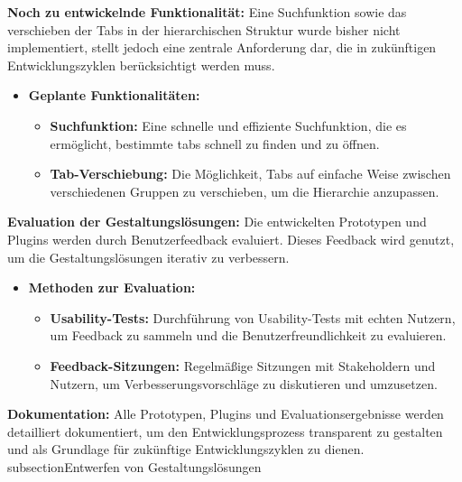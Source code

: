 \textbf{Noch zu entwickelnde Funktionalität:}
Eine Suchfunktion sowie das verschieben der Tabs in der hierarchischen Struktur wurde bisher nicht implementiert, stellt jedoch eine zentrale Anforderung dar, die in zukünftigen Entwicklungszyklen berücksichtigt werden muss.

\begin{itemize}
    \item \textbf{Geplante Funktionalitäten:}
    \begin{itemize}
        \item \textbf{Suchfunktion:} Eine schnelle und effiziente Suchfunktion, die es ermöglicht, bestimmte \gls{tab}s schnell zu finden und zu öffnen.
        \item \textbf{Tab-Verschiebung:} Die Möglichkeit, Tabs auf einfache Weise zwischen verschiedenen Gruppen zu verschieben, um die Hierarchie anzupassen.
    \end{itemize}
\end{itemize}

\textbf{Evaluation der Gestaltungslösungen:}
Die entwickelten Prototypen und Plugins werden durch Benutzerfeedback evaluiert. 
Dieses Feedback wird genutzt, um die Gestaltungslösungen iterativ zu verbessern.

\begin{itemize}
    \item \textbf{Methoden zur Evaluation:}
    \begin{itemize}
        \item \textbf{Usability-Tests:} Durchführung von Usability-Tests mit echten Nutzern, um Feedback zu sammeln und die Benutzerfreundlichkeit zu evaluieren.
        \item \textbf{Feedback-Sitzungen:} Regelmäßige Sitzungen mit Stakeholdern und Nutzern, um Verbesserungsvorschläge zu diskutieren und umzusetzen.
    \end{itemize}
\end{itemize}

\textbf{Dokumentation:}
Alle Prototypen, Plugins und Evaluationsergebnisse werden detailliert dokumentiert, um den Entwicklungsprozess transparent zu gestalten und als Grundlage für zukünftige Entwicklungszyklen zu dienen.
subsection{Entwerfen von Gestaltungslösungen}